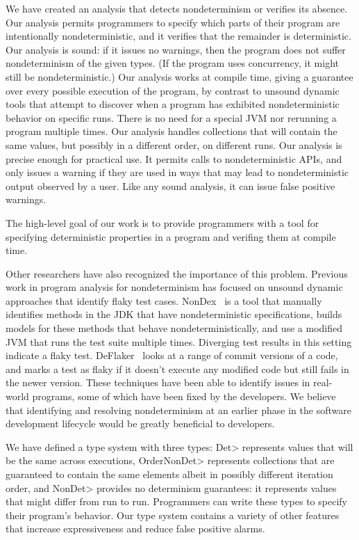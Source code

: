 We have created an analysis that detects nondeterminism or verifies its
absence.
Our analysis permits programmers to specify which parts of their program
are intentionally nondeterministic, and it verifies that the remainder is deterministic.
%
Our analysis is sound:  if it issues no warnings, then the program does not
suffer nondeterminism of the given types.  (If the program uses concurrency,
it might still be nondeterministic.)
%
Our analysis works at compile time, giving a guarantee over every possible
execution of the program, by contrast to unsound dynamic tools that attempt
to discover when a program has exhibited nondeterministic behavior on
specific runs.  There is no need for a special JVM nor rerunning a program
multiple times.
%
Our analysis handles collections that will contain the same values, but
possibly in a different order, on different runs.
%
Our analysis is precise enough for practical use.  It permits calls to
nondeterministic APIs, and only issues a warning if they are used in ways
that may lead to nondeterministic output observed by a user.  Like any
sound analysis, it can issue false positive warnings.



The high-level goal of our work is to provide programmers with a tool for
specifying deterministic properties in a program and verifing them
at compile time.


Other researchers have also recognized the importance of this problem.
Previous work in program analysis for nondeterminism has focused on unsound dynamic
approaches that identify flaky test cases.
NonDex~\cite{nondex} is a tool that manually
identifies methods in the JDK that have nondeterministic specifications, builds models for
these methods that behave nondeterministically, and  use a modified JVM that runs the test suite multiple times.
Diverging test results in this setting indicate a flaky test. DeFlaker~\cite{deflaker} looks at a range of commit versions
of a code, and marks a test as flaky if it doesn't execute any modified code but still fails in the newer version. These techniques
have been able to identify issues in real-world programs, some of which
have been fixed by the developers. We believe that identifying and
resolving nondeterminism
at an earlier phase in the software development lifecycle would be greatly beneficial to
developers.

We have defined a type system with three types:
\<Det> represents values that will be the same across executions,
\<OrderNonDet> represents collections that are guaranteed to contain the same elements albeit in possibly
different iteration order, and
\<NonDet> provides no determinism guarantees:  it represents values that
might differ from run to run.
Programmers can write these types to specify their program's behavior.
Our type system contains a variety of other features that increase
expressiveness and reduce false positive alarms.

